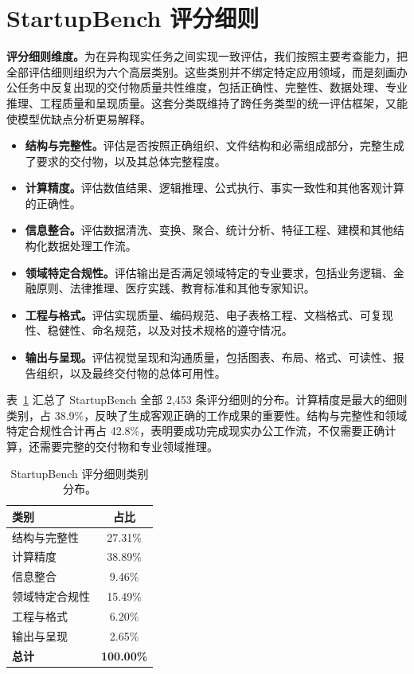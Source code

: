 \section{StartupBench 评分细则}
\label{app:rubrics}

\textbf{评分细则维度。}为在异构现实任务之间实现一致评估，我们按照主要考查能力，把全部评估细则组织为六个高层类别。这些类别并不绑定特定应用领域，而是刻画办公任务中反复出现的交付物质量共性维度，包括正确性、完整性、数据处理、专业推理、工程质量和呈现质量。这套分类既维持了跨任务类型的统一评估框架，又能使模型优缺点分析更易解释。

\begin{itemize}
    \item \textbf{结构与完整性。}评估是否按照正确组织、文件结构和必需组成部分，完整生成了要求的交付物，以及其总体完整程度。

    \item \textbf{计算精度。}评估数值结果、逻辑推理、公式执行、事实一致性和其他客观计算的正确性。

    \item \textbf{信息整合。}评估数据清洗、变换、聚合、统计分析、特征工程、建模和其他结构化数据处理工作流。

    \item \textbf{领域特定合规性。}评估输出是否满足领域特定的专业要求，包括业务逻辑、金融原则、法律推理、医疗实践、教育标准和其他专家知识。

    \item \textbf{工程与格式。}评估实现质量、编码规范、电子表格工程、文档格式、可复现性、稳健性、命名规范，以及对技术规格的遵守情况。

    \item \textbf{输出与呈现。}评估视觉呈现和沟通质量，包括图表、布局、格式、可读性、报告组织，以及最终交付物的总体可用性。
\end{itemize}

表~\ref{tab:rubric_distribution} 汇总了 StartupBench 全部 2,453 条评分细则的分布。计算精度是最大的细则类别，占 38.9\%，反映了生成客观正确的工作成果的重要性。结构与完整性和领域特定合规性合计再占 42.8\%，表明要成功完成现实办公工作流，不仅需要正确计算，还需要完整的交付物和专业领域推理。

\begin{table}[h]
\centering
\small
\caption{StartupBench 评分细则类别分布。}
\label{tab:rubric_distribution}
\begin{tabular}{lc}
\toprule
\textbf{类别} & \textbf{占比} \\
\midrule
结构与完整性 & 27.31\% \\
计算精度 & 38.89\% \\
信息整合 & 9.46\% \\
领域特定合规性 & 15.49\% \\
工程与格式 & 6.20\% \\
输出与呈现 & 2.65\% \\
\midrule
\textbf{总计} & \textbf{100.00\%} \\
\bottomrule
\end{tabular}
\end{table}

